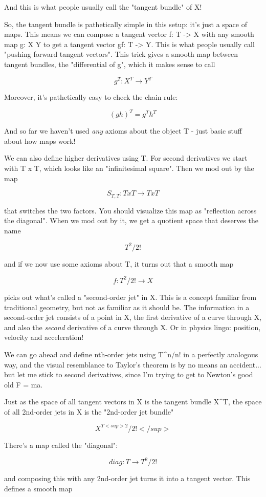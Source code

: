 And this is what people usually call the "tangent bundle" of X!   

So, the tangent bundle is pathetically simple in this setup: it's just
a space of maps.  This means we can compose a tangent vector f: T
-> X with any smooth map g: X \to  Y to get a tangent vector gf: T
-> Y.  This is what people usually call "pushing forward
tangent vectors".  This trick gives a smooth map between tangent
bundles, the "differential of g", which it makes sense to
call


$$

g^{T}: X^{T} \to  Y^{T}
$$
    
Moreover, it's pathetically easy to check the chain rule:


$$

(gh)^{T} = g^{T} h^{T}
$$
    

And so far we haven't used \emph{any} axioms about the object T - just basic 
stuff about how maps work!

We can also define higher derivatives using T.  For second derivatives
we start with T x T, which looks like an "infinitesimal square".  Then
we mod out by the map


$$

S_{T,T}: T x T \to  T x T
$$
    

that switches the two factors.  You should visualize this map as 
"reflection across the diagonal".  When we mod out by it, we get 
a quotient space that deserves the name


$$

T^{2}/2!
$$
    

and if we now use some axioms about T, it turns out that a smooth map


$$

f: T^{2}/2! \to  X
$$
    

picks out what's called a "second-order jet" in X.  This is a concept
familiar from traditional geometry, but not as familiar as it should be.
The information in a second-order jet consists of a point in X, the 
first derivative of a curve through X, and also the \emph{second} derivative 
of a curve through X.   Or in physics lingo: position, velocity and 
acceleration!  

We can go ahead and define nth-order jets using T^{n}/n! in a perfectly
analogous way, and the visual resemblance to Taylor's theorem is by no
means an accident... but let me stick to second derivatives, since I'm
trying to get to Newton's good old F = ma.

Just as the space of all tangent vectors in X is the tangent bundle
X^{T}, the space of all 2nd-order jets in X is the
"2nd-order jet bundle"


$$

X^{T<sup>2}/2!</sup>
$$
    
There's a map called the "diagonal": 


$$

diag: T \to  T^{2}/2! 
$$
    

and composing this with any 2nd-order jet 
turns it into a tangent vector.  This defines
a smooth map




